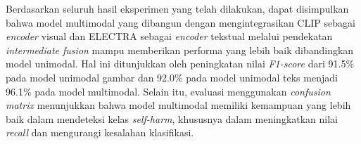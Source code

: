 Berdasarkan seluruh hasil eksperimen yang telah dilakukan, dapat disimpulkan bahwa model multimodal yang dibangun dengan mengintegrasikan CLIP sebagai \textit{encoder} visual dan ELECTRA sebagai \textit{encoder} tekstual melalui pendekatan \textit{intermediate fusion} mampu memberikan performa yang lebih baik dibandingkan model unimodal. Hal ini ditunjukkan oleh peningkatan nilai \textit{F1-score} dari 91.5\% pada model unimodal gambar dan 92.0\% pada model unimodal teks menjadi 96.1\% pada model multimodal. Selain itu, evaluasi menggunakan \textit{confusion matrix} menunjukkan bahwa model multimodal memiliki kemampuan yang lebih baik dalam mendeteksi kelas \textit{self-harm}, khususnya dalam meningkatkan nilai \textit{recall} dan mengurangi kesalahan klasifikasi.